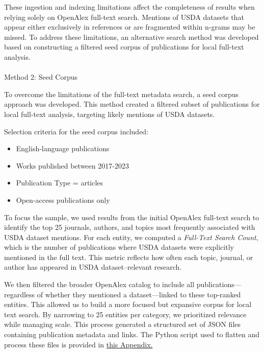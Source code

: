 \documentclass[
  letterpaper,
  DIV=11,
  numbers=noendperiod]{scrartcl}
\makeatletter
\let\oldparagraph\paragraph
\renewcommand{\paragraph}{
    \@ifstar
      \xxxParagraphStar
      \xxxParagraphNoStar
  }
\newcommand{\xxxParagraphStar}[1]{\oldparagraph*{#1}\mbox{}}
\newcommand{\xxxParagraphNoStar}[1]{\oldparagraph{#1}\mbox{}}
\providecommand{\tightlist}{%
  \setlength{\itemsep}{0pt}\setlength{\parskip}{0pt}}\usepackage{longtable,booktabs,array}
\makeatother
\begin{document}
These ingestion and indexing limitations affect the completeness of
results when relying solely on OpenAlex full-text search. Mentions of
USDA datasets that appear either exclusively in references or are
fragmented within n-grams may be missed. To address these limitations,
an alternative search method was developed based on constructing a
filtered seed corpus of publications for local full-text analysis.

\paragraph{Method 2: Seed Corpus}\label{method-2-seed-corpus}

To overcome the limitations of the full-text metadata search, a seed
corpus approach was developed. This method created a filtered subset of
publications for local full-text analysis, targeting likely mentions of
USDA datasets.

Selection criteria for the seed corpus included:

\begin{itemize}
\tightlist
\item
  English-language publications
\item
  Works published between 2017-2023
\item
  Publication Type = articles
\item
  Open-access publications only
\end{itemize}

To focus the sample, we used results from the initial OpenAlex full-text
search to identify the top 25 journals, authors, and topics most
frequently associated with USDA dataset mentions. For each entity, we
computed a \emph{Full-Text Search Count}, which is the number of
publications where USDA datasets were explicitly mentioned in the full
text. This metric reflects how often each topic, journal, or author has
appeared in USDA dataset--relevant research.

We then filtered the broader OpenAlex catalog to include all
publications---regardless of whether they mentioned a dataset---linked
to these top-ranked entities. This allowed us to build a more focused
but expansive corpus for local text search. By narrowing to 25 entities
per category, we prioritized relevance while managing scale. This
process generated a structured set of JSON files containing publication
metadata and links. The Python script used to flatten and process these
files is provided in
\href{https://laurenchenarides.github.io/compare_scopus_openalex_report/appendix.html}{this
Appendix.}
\end{document}
